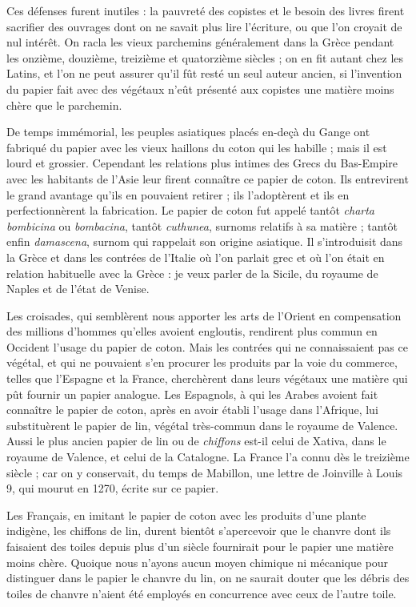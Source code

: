 \documentclass[a4paper, 11pt, oneside, polutonikogreek, french]{article}
\begin{document}
Ces défenses furent inutiles : la pauvreté des copistes et le besoin des livres firent sacrifier des ouvrages dont on ne savait plus lire l'écriture, ou que l'on croyait de nul intérêt. On racla les vieux parchemins généralement dans la Grèce pendant les onzième, douzième, treizième et quatorzième siècles ; on en fit autant chez les Latins, et l'on ne peut assurer qu'il fût resté un seul auteur ancien, si l'invention du papier fait avec des végétaux n'eût présenté aux copistes une matière moins chère que le parchemin.

De temps immémorial, les peuples asiatiques placés en-deçà du Gange ont fabriqué du papier avec les vieux haillons du coton qui les habille ; mais il est lourd et grossier. Cependant les relations plus intimes des Grecs du Bas-Empire avec les habitants de l'Asie leur firent connaître ce papier de coton. Ils entrevirent le grand avantage qu'ils en pouvaient retirer ; ils l'adoptèrent et ils en perfectionnèrent la fabrication. Le papier de coton fut appelé tantôt \emph{charta bombicina} ou \emph{bombacina}, tantôt \emph{cuthunea}, surnoms relatifs à sa matière ; tantôt enfin \emph{damascena}, surnom qui rappelait son origine asiatique. Il s'introduisit dans la Grèce et dans les contrées de l'Italie où l'on parlait grec et où l'on était en relation habituelle avec la Grèce : je veux parler de la Sicile, du royaume de Naples et de l'état de Venise.

Les croisades, qui semblèrent nous apporter les arts de l'Orient en compensation des millions d'hommes qu'elles avoient engloutis, rendirent plus commun en Occident l'usage du papier de coton. Mais les contrées qui ne connaissaient pas ce végétal, et qui ne pouvaient s'en procurer les produits par la voie du commerce, telles que l'Espagne et la France, cherchèrent dans leurs végétaux une matière qui pût fournir un papier analogue. Les Espagnols, à qui les Arabes avoient fait connaître le papier de coton, après en avoir établi l'usage dans l'Afrique, lui substituèrent le papier de lin, végétal très-commun dans le royaume de Valence. Aussi le plus ancien papier de lin ou de \emph{chiffons} est-il celui de Xativa, dans le royaume de Valence, et celui de la Catalogne. La France l'a connu dès le treizième siècle ; car on y conservait, du temps de Mabillon, une lettre de Joinville à Louis 9, qui mourut en 1270, écrite sur ce papier.

Les Français, en imitant le papier de coton avec les produits d'une plante indigène, les chiffons de lin, durent bientôt s'apercevoir que le chanvre dont ils faisaient des toiles depuis plus d'un siècle fournirait pour le papier une matière moins chère. Quoique nous n'ayons aucun moyen chimique ni mécanique pour distinguer dans le papier le chanvre du lin, on ne saurait douter que les débris des toiles de chanvre n'aient été employés en concurrence avec ceux de l'autre toile.
\end{document}
